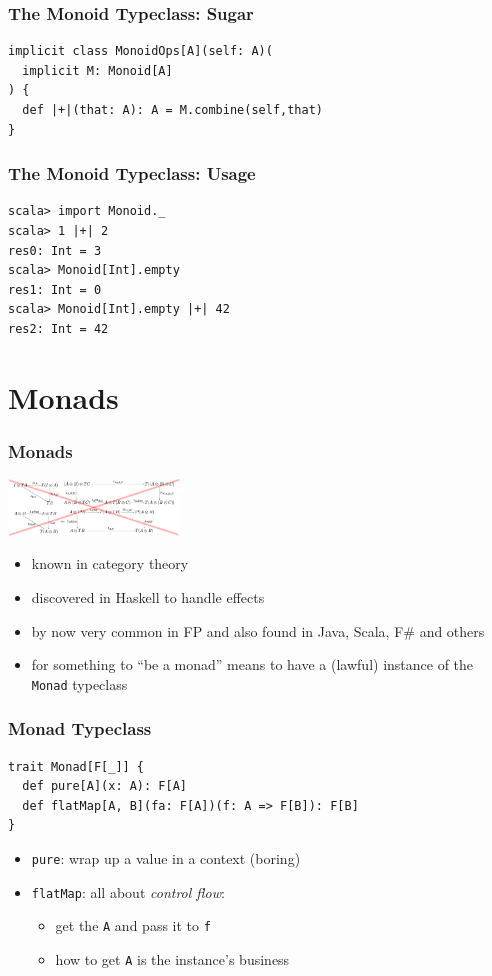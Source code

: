 \documentclass{beamer}
\begin{document}
\begin{frame}[fragile]
  \frametitle{The Monoid Typeclass: Sugar}
\begin{verbatim}
implicit class MonoidOps[A](self: A)(
  implicit M: Monoid[A]
) {
  def |+|(that: A): A = M.combine(self,that)
}
\end{verbatim}
\end{frame}

\begin{frame}[fragile]
  \frametitle{The Monoid Typeclass: Usage}
\begin{verbatim}
scala> import Monoid._
scala> 1 |+| 2
res0: Int = 3
scala> Monoid[Int].empty
res1: Int = 0
scala> Monoid[Int].empty |+| 42
res2: Int = 42
\end{verbatim}
\end{frame}

\section{Monads}

\begin{frame}
  \frametitle{Monads}
  \begin{center}
    \includegraphics[height=15mm]{pics/strong-monads.png}
  \end{center}
  \begin{itemize}
  \item known in category theory
  \item discovered in Haskell to handle effects
  \item by now very common in FP and also found in Java, Scala, F\#
    and others
  \item for something to ``be a monad'' means to have a (lawful)
    instance of the \texttt{Monad} typeclass
  \end{itemize}
\end{frame}

\begin{frame}[fragile]
  \frametitle{Monad Typeclass}
\begin{verbatim}
trait Monad[F[_]] {
  def pure[A](x: A): F[A]
  def flatMap[A, B](fa: F[A])(f: A => F[B]): F[B]
}
\end{verbatim}
  \begin{itemize}
  \item \texttt{pure}: wrap up a value in a context (boring)
  \item \texttt{flatMap}: all about \textit{control flow}:
    \begin{itemize}
    \item get the \texttt{A} and pass it to \texttt{f}
    \item how to get \texttt{A} is the instance's business
    \end{itemize}
  \end{itemize}
\end{frame}
\end{document}
